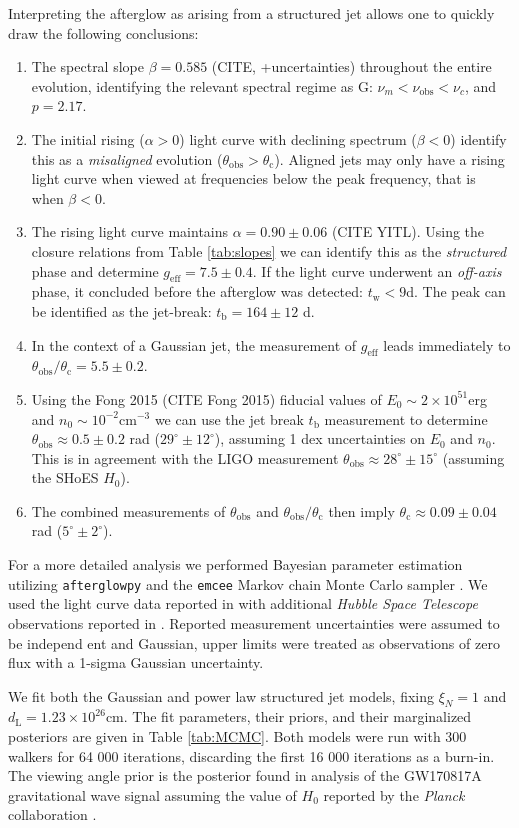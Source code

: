 \documentclass[twocolumn]{aastex62}
\newcommand{\gwbns}{GW170817A}
\newcommand{\afterglowpy}{{\tt afterglowpy}}
\newcommand{\emcee}{{\tt emcee}}
\newcommand{\hubble}{{\em Hubble Space Telescope}}
\newcommand{\planck}{{\em Planck}}
\newcommand{\tW}{\ensuremath{t_{\mathrm{w}}}}
\newcommand{\tb}{\ensuremath{t_{\mathrm{b}}}}
\newcommand{\nuobs}{\ensuremath{\nu_{\mathrm{obs}}}}
\newcommand{\thobs}{\ensuremath{\theta_{\mathrm{obs}}}}
\newcommand{\thC}{\ensuremath{\theta_{\mathrm{c}}}}
\newcommand{\dL}{\ensuremath{d_{\mathrm{L}}}}
\newcommand{\geff}{\ensuremath{g_{\mathrm{eff}}}}
\begin{document}
Interpreting the afterglow as arising from a structured jet allows one to quickly draw the following conclusions:
\begin{enumerate}
	\item The spectral slope $\beta = 0.585$ (CITE, +uncertainties) throughout the entire evolution, identifying the relevant spectral regime as G: $\nu_m < \nuobs < \nu_c$, and $p = 2.17$.
	\item The initial rising ($\alpha > 0$) light curve with declining spectrum ($\beta < 0$) identify this as a \emph{misaligned} evolution ($\thobs > \thC$).  Aligned jets may only have a rising light curve when viewed at frequencies below the peak frequency, that is when $\beta < 0$.
	\item The rising light curve maintains $\alpha  = 0.90 \pm 0.06$ (CITE YITL).  Using the closure relations from Table \ref{tab:slopes} we can identify this as the \emph{structured} phase and determine $\geff = 7.5 \pm 0.4$.  If the light curve underwent an \emph{off-axis} phase, it concluded before the afterglow was detected: $\tW < 9$d.  The peak can be identified as the jet-break: $\tb = 164 \pm 12$ d.
	\item In the context of a Gaussian jet, the measurement of $\geff$ leads immediately to $\thobs / \thC = 5.5 \pm 0.2$.
	\item Using the Fong 2015 (CITE Fong 2015) fiducial values of $E_0 \sim 2\times 10^{51}$erg and $n_0 \sim 10^{-2}$cm$^{-3}$ we can use the jet break $\tb$ measurement to determine $\thobs \approx 0.5 \pm 0.2$ rad ($29^\circ \pm 12^\circ$), assuming 1 dex uncertainties on $E_0$ and $n_0$.    This is in agreement with the LIGO measurement $\thobs \approx 28^\circ \pm 15^\circ$ (assuming the SHoES $H_0$).
	\item The combined measurements of $\thobs$ and $\thobs/\thC$ then imply $\thC \approx 0.09 \pm 0.04$ rad ($5^\circ  \pm 2^\circ$).
\end{enumerate}

For a more detailed analysis we performed Bayesian parameter estimation utilizing \afterglowpy{} and the \emcee{} Markov chain Monte Carlo sampler \citep{Foreman-Mackey:2013aa}.  We used the light curve data reported in \citet{van-Eerten:2018aa} with additional \hubble{} observations reported in \citet{Lamb:2019aa}. Reported measurement uncertainties were assumed to be independ
ent and Gaussian, upper limits were treated as observations of zero flux with a 1-sigma Gaussian uncertainty. 

We fit both the Gaussian and power law structured jet models, fixing $\xi_N = 1$ and $\dL = 1.23 \times 10^{26}$cm.  The fit parameters, their priors, and their marginalized posteriors are given in Table \ref{tab:MCMC}. Both models were run with 300 walkers for 64 000 iterations, discarding the first 16 000 iterations as a burn-in.  The viewing angle prior is the posterior found in analysis of the \gwbns{} gravitational wave signal assuming the value of $H_0$ reported by the \planck{} collaboration \citep{Abbott:2017aa, Planck-Collaboration:2016aa, Troja:2018aa}.  
\end{document}
